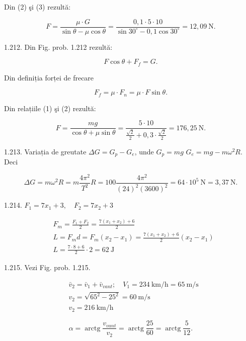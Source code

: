 Din (2) şi (3) rezultă:

$$
F=\frac{\mu \cdot G}{\sin \theta-\mu \cos \theta}=\frac{0,1 \cdot 5 \cdot 10}{\sin 30^{\circ}-0,1 \cos 30^{\circ}}=12,09 \mathrm{~N} .
$$

1.212. Din Fig. prob. 1.212 rezultă:


\begin{equation*}
F \cos \theta+F_{f}=G . \tag{1}
\end{equation*}


Din definiția forței de frecare


\begin{equation*}
F_{f}=\mu \cdot F_{n}=\mu \cdot F \sin \theta . \tag{2}
\end{equation*}


Din relațiile (1) şi (2) rezultă:

$$
F=\frac{m g}{\cos \theta+\mu \sin \theta}=\frac{5 \cdot 10}{\frac{\sqrt{2}}{2}+0,3 \cdot \frac{\sqrt{2}}{2}}=176,25 \mathrm{~N} .
$$

1.213. Variația de greutate $\Delta G=G_{p}-G_{e}$, unde $G_{p}=m g$ $G_{e}=m g-m \omega^{2} R$. Deci

$$
\Delta G=m \omega^{2} R=m \frac{4 \pi^{2}}{T^{2}} R=100 \frac{4 \pi^{2}}{(24)^{2}(3600)^{2}}=64 \cdot 10^{5} \mathrm{~N}=3,37 \mathrm{~N} .
$$

1.214. $F_{1}=7 x_{1}+3, \quad F_{2}=7 x_{2}+3$

$$
\begin{aligned}
& F_{m}=\frac{F_{1}+F_{2}}{2}=\frac{7\left(x_{1}+x_{2}\right)+6}{2} \\
& L=F_{m} d=F_{m}\left(x_{2}-x_{1}\right)=\frac{7\left(x_{1}+x_{2}\right)+6}{2}\left(x_{2}-x_{1}\right) \\
& L=\frac{7 \cdot 8+6}{2} \cdot 2=62 \mathrm{~J}
\end{aligned}
$$

1.215. Vezi Fig. prob. 1.215.

$$
\begin{aligned}
& \bar{v}_{2}=\bar{v}_{1}+\bar{v}_{v a n t} ; \quad V_{1}=234 \mathrm{~km} / \mathrm{h}=65 \mathrm{~m} / \mathrm{s} \\
& v_{2}=\sqrt{65^{2}-25^{2}}=60 \mathrm{~m} / \mathrm{s} \\
& v_{2}=216 \mathrm{~km} / \mathrm{h}
\end{aligned}
$$

$$
\alpha=\operatorname{arctg} \frac{v_{v a n t}}{v_{2}}=\operatorname{arctg} \frac{25}{60}=\operatorname{arctg} \frac{5}{12} .
$$

